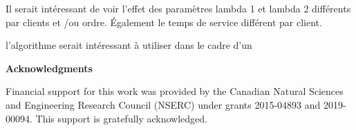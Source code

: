 \documentclass{article}
\begin{document}
Il serait intéressant de voir l'effet des paramètres lambda 1 et lambda 2 différents par clients et /ou ordre. Également le temps de service différent par client. 

l'algorithme serait intéressant à utiliser dans le cadre d'un 


\vspace{0.1in}


\vspace{1.5cm} \noindent \textbf{Acknowledgments}

Financial support for this work was provided by the Canadian Natural Sciences and Engineering Research Council (NSERC) under grants 2015-04893 and 2019-00094. This support is gratefully acknowledged.




\end{document}
